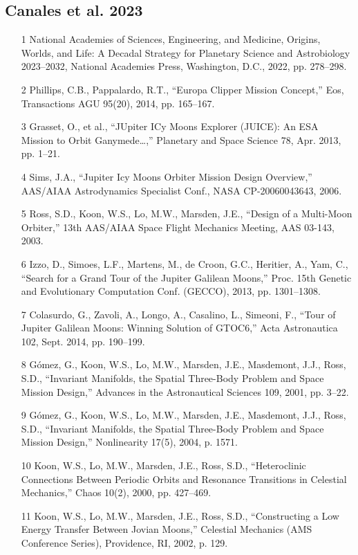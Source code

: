 \documentclass[12pt]{article}
\begin{document}
\subsection*{Canales et al. 2023}
\begin{enumerate}
\item [1] National Academies of Sciences, Engineering, and Medicine, Origins, Worlds, and Life: A Decadal Strategy for Planetary Science and Astrobiology 2023--2032, National Academies Press, Washington, D.C., 2022, pp. 278--298.
\item [2] Phillips, C.B., Pappalardo, R.T., ``Europa Clipper Mission Concept,'' Eos, Transactions AGU 95(20), 2014, pp. 165--167.
\item [3] Grasset, O., et al., ``JUpiter ICy Moons Explorer (JUICE): An ESA Mission to Orbit Ganymede…,'' Planetary and Space Science 78, Apr. 2013, pp. 1--21.
\item [4] Sims, J.A., ``Jupiter Icy Moons Orbiter Mission Design Overview,'' AAS/AIAA Astrodynamics Specialist Conf., NASA CP-20060043643, 2006.
\item [5] Ross, S.D., Koon, W.S., Lo, M.W., Marsden, J.E., ``Design of a Multi-Moon Orbiter,'' 13th AAS/AIAA Space Flight Mechanics Meeting, AAS 03-143, 2003.
\item [6] Izzo, D., Simoes, L.F., Martens, M., de Croon, G.C., Heritier, A., Yam, C., ``Search for a Grand Tour of the Jupiter Galilean Moons,'' Proc. 15th Genetic and Evolutionary Computation Conf. (GECCO), 2013, pp. 1301--1308.
\item [7] Colasurdo, G., Zavoli, A., Longo, A., Casalino, L., Simeoni, F., ``Tour of Jupiter Galilean Moons: Winning Solution of GTOC6,'' Acta Astronautica 102, Sept. 2014, pp. 190--199.
\item [8] Gómez, G., Koon, W.S., Lo, M.W., Marsden, J.E., Masdemont, J.J., Ross, S.D., ``Invariant Manifolds, the Spatial Three-Body Problem and Space Mission Design,'' Advances in the Astronautical Sciences 109, 2001, pp. 3--22.
\item [9] Gómez, G., Koon, W.S., Lo, M.W., Marsden, J.E., Masdemont, J.J., Ross, S.D., ``Invariant Manifolds, the Spatial Three-Body Problem and Space Mission Design,'' Nonlinearity 17(5), 2004, p. 1571.
\item [10] Koon, W.S., Lo, M.W., Marsden, J.E., Ross, S.D., ``Heteroclinic Connections Between Periodic Orbits and Resonance Transitions in Celestial Mechanics,'' Chaos 10(2), 2000, pp. 427--469.
\item [11] Koon, W.S., Lo, M.W., Marsden, J.E., Ross, S.D., ``Constructing a Low Energy Transfer Between Jovian Moons,'' Celestial Mechanics (AMS Conference Series), Providence, RI, 2002, p. 129.

\end{enumerate}
\end{document}
